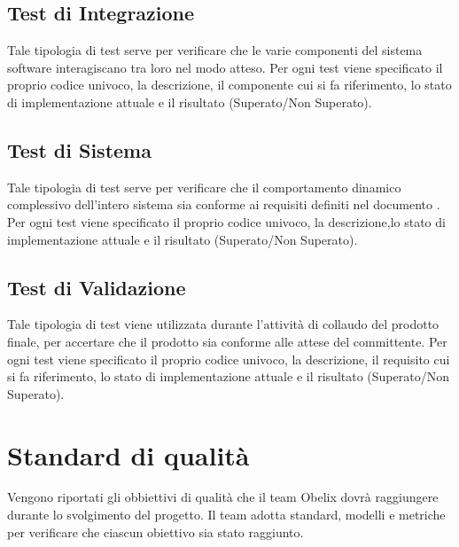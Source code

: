 {

\subsection{Test di Integrazione}

Tale tipologia di test serve per verificare che le varie componenti
del sistema software interagiscano tra loro nel modo atteso. Per ogni
test viene specificato il proprio codice univoco, la descrizione, il
componente cui si fa riferimento, lo stato di implementazione attuale
e il risultato (Superato/Non Superato). 



\subsection{Test di Sistema}

Tale tipologia di test serve per verificare che il comportamento
dinamico complessivo dell’intero sistema sia conforme ai requisiti
definiti nel documento \analisideirequisiti. Per ogni test viene
specificato il proprio codice univoco, la descrizione,lo stato di
implementazione attuale e il risultato (Superato/Non Superato). 



\subsection{Test di Validazione}

Tale tipologia di test viene utilizzata durante l’attività di collaudo
del prodotto finale, per accertare che il prodotto sia conforme alle
attese del committente. Per ogni test viene specificato il proprio
codice univoco, la descrizione, il requisito cui si fa riferimento, lo
stato di implementazione attuale e il risultato (Superato/Non
Superato). 


  \clearpage


  \appendix


  \section{Standard di qualità}

  Vengono riportati gli obbiettivi di qualità che il team Obelix
  dovrà raggiungere durante lo svolgimento del progetto.  Il team
  adotta  standard, modelli e metriche per verificare che ciascun
  obiettivo sia stato raggiunto.


}
